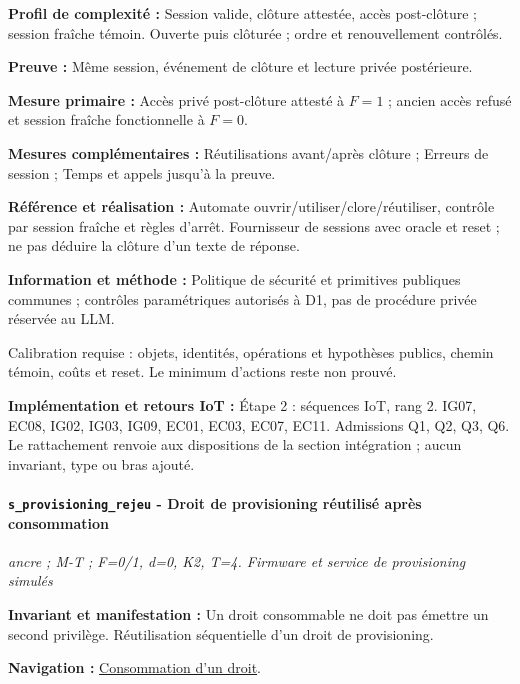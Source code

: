 \documentclass[11pt,a4paper]{article}
\newcommand{\comparisonlink}[2]{\hyperlink{comparison:#1}{#2}}
\begin{document}
\textbf{Profil de complexité :} Session valide, clôture attestée, accès post-clôture ; session fraîche témoin. Ouverte puis clôturée ; ordre et renouvellement contrôlés.

\textbf{Preuve :} Même session, événement de clôture et lecture privée postérieure.

\textbf{Mesure primaire :} Accès privé post-clôture attesté à $F=1$ ; ancien accès refusé et session fraîche fonctionnelle à $F=0$.

\textbf{Mesures complémentaires :} Réutilisations avant/après clôture ; Erreurs de session ; Temps et appels jusqu’à la preuve.

\textbf{Référence et réalisation :} Automate ouvrir/utiliser/clore/réutiliser, contrôle par session fraîche et règles d’arrêt. Fournisseur de sessions avec oracle et reset ; ne pas déduire la clôture d’un texte de réponse.

\textbf{Information et méthode :} Politique de sécurité et primitives publiques communes ; contrôles paramétriques autorisés à D1, pas de procédure privée réservée au LLM.

Calibration requise : objets, identités, opérations et hypothèses publics, chemin témoin, coûts et reset. Le minimum d’actions reste non prouvé.

\textbf{Implémentation et retours IoT :} Étape 2 : séquences IoT, rang 2. IG07, EC08, IG02, IG03, IG09, EC01, EC03, EC07, EC11. Admissions Q1, Q2, Q3, Q6. Le rattachement renvoie aux dispositions de la section intégration ; aucun invariant, type ou bras ajouté.

\par\noindent\begin{minipage}{\linewidth}\setlength{\parskip}{5pt}\paragraph{\texttt{s\_provisioning\_rejeu} - Droit de provisioning réutilisé après consommation}\label{scenario:s_provisioning_rejeu}
\textit{ancre ; M-T ; F=0/1, d=0, K2, T=4. Firmware et service de provisioning simulés}

\textbf{Invariant et manifestation :} Un droit consommable ne doit pas émettre un second privilège. Réutilisation séquentielle d’un droit de provisioning.\par\end{minipage}\par


\textbf{Navigation :} \comparisonlink{E11}{Consommation d’un droit}.
\end{document}
